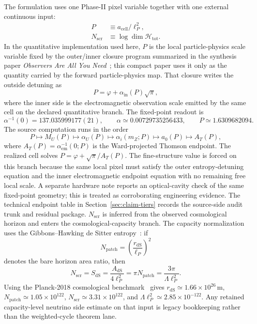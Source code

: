 \documentclass[11pt]{article}
\begin{document}
The formulation uses one Phase-II pixel variable together with one external continuous input:
\begin{align}
P &\equiv a_{\mathrm{cell}}/\ell_P^2,\\
N_{\mathrm{scr}} &\equiv \log \dim \mathcal H_{\mathrm{tot}}.
\end{align}
In the quantitative implementation used here, \(P\) is the local particle-physics scale variable
fixed by the outer/inner closure program summarized in the synthesis paper
\emph{Observers Are All You Need}~\cite{ophsynthesis}; this compact paper uses it only as the
quantity carried by the forward particle-physics map. That closure writes the outside
detuning as
\[
P=\varphi+\alpha_{\mathrm{in}}(P)\sqrt{\pi},
\]
where the inner side is the electromagnetic observation scale emitted by the same cell on the
declared quantitative branch. The fixed-point readout is
\[
\alpha^{-1}(0)=137.035999177(21),\qquad
\alpha\simeq0.00729735256433,\qquad
P\simeq1.6309682094.
\]
The source computation runs in the order
\[
P\mapsto M_U(P)\mapsto\alpha_U(P)\mapsto\alpha_i(m_Z;P)\mapsto
a_0(P)\mapsto A_T(P),
\]
where \(A_T(P)=\alpha_{\mathrm{em}}^{-1}(0;P)\) is the Ward-projected Thomson
endpoint. The realized cell solves \(P=\varphi+\sqrt{\pi}/A_T(P)\).
The fine-structure value is forced on this branch because the same local pixel
must satisfy the outer entropy-detuning equation and the inner electromagnetic
endpoint equation with no remaining free local scale.
A separate hardware note reports an optical-cavity check of the same fixed-point
geometry; this is treated as corroborating engineering evidence. The technical
endpoint table in Section~\ref{sec:claim-tiers} records the source-side audit
trunk and residual package.
\(N_{\mathrm{scr}}\) is inferred from the observed
cosmological horizon and enters the cosmological-capacity branch. The capacity normalization uses the
Gibbons--Hawking de Sitter entropy~\cite{gibbonsHawking77}: if
\[
N_{\mathrm{patch}}=\left(\frac{r_{\mathrm{dS}}}{\ell_P}\right)^2
\]
denotes the bare horizon area ratio, then
\[
N_{\mathrm{scr}}=S_{\mathrm{dS}}=\frac{A_{\mathrm{dS}}}{4\ell_P^2}
=\pi N_{\mathrm{patch}}
=\frac{3\pi}{\Lambda\ell_P^2}.
\]
Using the Planck-2018 cosmological benchmark~\cite{planck18} gives
\(r_{\mathrm{dS}}\simeq1.66\times10^{26}\,\mathrm m\),
\(N_{\mathrm{patch}}\simeq1.05\times10^{122}\),
\(N_{\mathrm{scr}}\simeq3.31\times10^{122}\), and
\(\Lambda\ell_P^2\simeq2.85\times10^{-122}\). Any retained capacity-level
neutrino side estimate on that input is legacy bookkeeping rather than the weighted-cycle
theorem lane.
\end{document}
